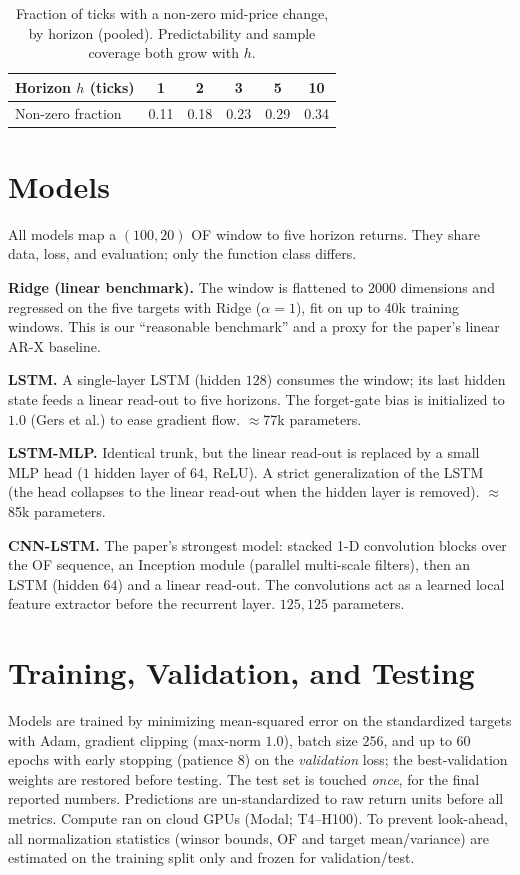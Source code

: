 \documentclass[10pt,twocolumn]{article}
\begin{document}
\begin{table}[t]
\centering\small
\caption{Fraction of ticks with a non-zero mid-price change, by horizon
(pooled). Predictability and sample coverage both grow with $h$.}
\label{tab:nonzero}
\begin{tabular}{lccccc}
\toprule
Horizon $h$ (ticks) & 1 & 2 & 3 & 5 & 10 \\
\midrule
Non-zero fraction & 0.11 & 0.18 & 0.23 & 0.29 & 0.34 \\
\bottomrule
\end{tabular}
\end{table}

\section{Models}

All models map a $(100,20)$ OF window to five horizon returns. They share data,
loss, and evaluation; only the function class differs.

\textbf{Ridge (linear benchmark).} The window is flattened to $2000$ dimensions
and regressed on the five targets with Ridge ($\alpha{=}1$), fit on up to $40$k
training windows. This is our ``reasonable benchmark'' and a proxy for the paper's
linear AR-X baseline.

\textbf{LSTM.} A single-layer LSTM (hidden $128$) consumes the window; its last
hidden state feeds a linear read-out to five horizons. The forget-gate bias is
initialized to $1.0$ (Gers et al.) to ease gradient flow. $\approx$77k parameters.

\textbf{LSTM-MLP.} Identical trunk, but the linear read-out is replaced by a small
MLP head ($1$ hidden layer of $64$, ReLU). A strict generalization of the LSTM
(the head collapses to the linear read-out when the hidden layer is removed).
$\approx$85k parameters.

\textbf{CNN-LSTM.} The paper's strongest model: stacked 1-D convolution blocks
over the OF sequence, an Inception module (parallel multi-scale filters), then an
LSTM (hidden $64$) and a linear read-out. The convolutions act as a learned local
feature extractor before the recurrent layer. $125{,}125$ parameters.

\section{Training, Validation, and Testing}

Models are trained by minimizing mean-squared error on the standardized targets
with Adam, gradient clipping (max-norm $1.0$), batch size $256$, and up to
$60$ epochs with early stopping (patience $8$) on the \emph{validation} loss; the
best-validation weights are restored before testing. The test set is touched
\emph{once}, for the final reported numbers. Predictions are un-standardized to raw
return units before all metrics. Compute ran on cloud GPUs (Modal; T4--H100). To
prevent look-ahead, all normalization statistics (winsor bounds, OF and target
mean/variance) are estimated on the training split only and frozen for
validation/test.
\end{document}
